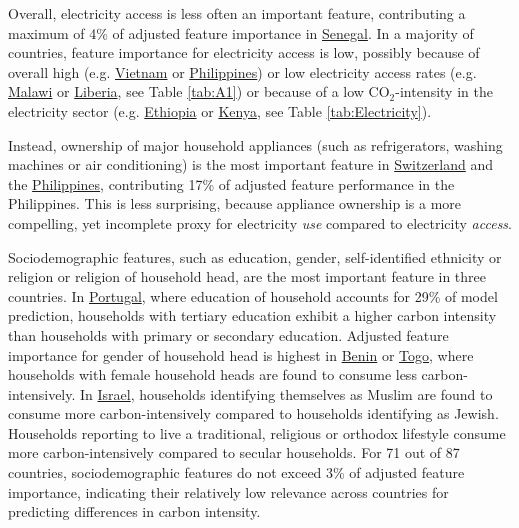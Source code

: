 \documentclass[12pt, a4paper]{article}
\begin{document}
Overall, electricity access is less often an important feature, contributing a maximum of 4\% of adjusted feature importance in \hyperref[fig:5b_SEN]{Senegal}. In a majority of countries, feature importance for electricity access is low, possibly because of overall high (e.g. \hyperref[fig:5b_VNM]{Vietnam} or \hyperref[fig:5b_PHL]{Philippines}) or low electricity access rates (e.g. \hyperref[fig:5b_MWI]{Malawi} or \hyperref[fig:5b_LBR]{Liberia}, see Table \ref{tab:A1}) or because of a low CO$_{2}$-intensity in the electricity sector (e.g. \hyperref[fig:5b_ETH]{Ethiopia} or \hyperref[fig:5b_KEN]{Kenya}, see Table \ref{tab:Electricity}).

Instead, ownership of major household appliances (such as refrigerators, washing machines or air conditioning) is the most important feature in \hyperref[fig:5b_CHE]{Switzerland} and the \hyperref[fig:5b_PHL]{Philippines}, contributing 17\% of adjusted feature performance in the Philippines. This is less surprising, because appliance ownership is a more compelling, yet incomplete proxy for electricity \textit{use} compared to electricity \textit{access}.

Sociodemographic features, such as education, gender, self-identified ethnicity or religion or religion of household head, are the most important feature in three countries. In \hyperref[fig:5b_PRT]{Portugal}, where education of household accounts for 29\% of model prediction, households with tertiary education exhibit a higher carbon intensity than households with primary or secondary education. Adjusted feature importance for gender of household head is highest in \hyperref[fig:5b_BEN]{Benin} or \hyperref[fig:5b_TGO]{Togo}, where households with female household heads are found to consume less carbon-intensively. In \hyperref[fig:5b_ISR]{Israel}, households identifying themselves as Muslim are found to consume more carbon-intensively compared to households identifying as Jewish. Households reporting to live a traditional, religious or orthodox lifestyle consume more carbon-intensively compared to secular households. For 71 out of 87 countries, sociodemographic features do not exceed 3\% of adjusted feature importance, indicating their relatively low relevance across countries for predicting differences in carbon intensity.
\end{document}
